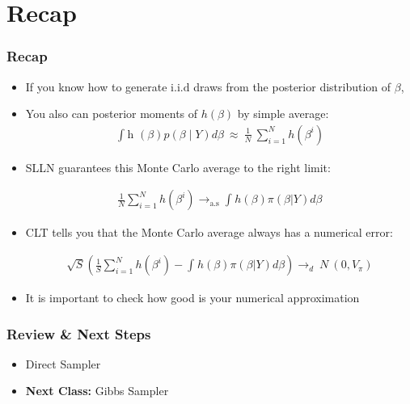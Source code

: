 \documentclass[
  shownotes,
  xcolor={svgnames},
  hyperref={colorlinks,citecolor=DarkBlue,linkcolor=DarkRed,urlcolor=DarkBlue}
  , aspectratio=169]{beamer}
\begin{document}
\section{Recap}
\begin{frame}[fragile]
\frametitle{Recap} 

\begin{itemize}
\item If you know how to generate $\text{i.i.d}$ draws from the posterior distribution of $\beta$,

\item You also can posterior moments of $h(\beta)$ by simple average:
\begin{align}
\int_{}^{}{\text{h\ }\left( \beta \right)p\left( \beta \middle| Y \right)d\beta}\  \approx \ \frac{1}{N}\ \sum_{i = 1}^{N}{h (\beta^{i})}
\end{align}
\item  SLLN guarantees this Monte Carlo average to the right limit:

\begin{align}
\frac{1}{N} \sum_{i = 1}^{N}{h\left( \beta^{i} \right) \rightarrow_{\text{a.s}} \int_{}^{} h\left( \beta \right)\pi\left( \beta | Y \right)d\beta }
\end{align}

\item CLT tells you that the Monte Carlo average always has a numerical error:

\begin{align}
\sqrt{S} \left( \frac{1}{S} \sum_{i = 1}^{N} h \left( \beta^{i} \right) - \int_{}^{}{h\left( \beta \right)\pi\left( \beta| Y \right)d\beta } \right)  \rightarrow_{d}\ N\ (0,V_{\pi}) 
\end{align}
\item  It is important to check how good is your numerical approximation
\end{itemize}
\end{frame}


\begin{frame}
\frametitle{Review \& Next Steps}
  
  \begin{itemize} 
    
    
    \item Direct Sampler
  \bigskip  

  
  \item  {\bf Next Class:} Gibbs Sampler

  
  
  \end{itemize}


\end{frame}
\end{document}
